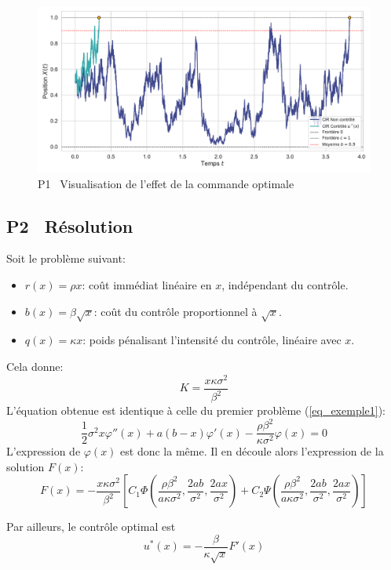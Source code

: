 \begin{figure}[htb]
    \centering
    \includegraphics[width=0.9\linewidth]{img/validation/P1/p1_control_simulation.pdf}
    \caption{P1 \textemdash~Visualisation de l'effet de la commande optimale}
\end{figure}

\subsection{P2 \textemdash~Résolution}\label{p2}
\noindent Soit le problème suivant: 
\begin{itemize}
    \item $r(x) = \rho x$: coût immédiat linéaire en $x$, indépendant du contrôle.
    \item $b(x) = \beta \sqrt{x}$: coût du contrôle proportionnel à $\sqrt{x}$.
    \item $q(x) = \kappa x$: poids pénalisant l'intensité du contrôle, linéaire avec $x$.
\end{itemize}
Cela donne: 
\[
K=\frac{x\kappa \sigma^2}{\beta^2}
\]
L'équation obtenue est identique à celle du premier problème (\ref{eq_exemple1}): 
\[
\frac{1}{2}\sigma^2 x\varphi''(x) + a(b - x)\varphi'(x) - \frac{\rho\beta^2}{\kappa \sigma^2}\varphi(x) = 0
\]
L'expression de $\varphi(x)$ est donc la même. Il en découle alors l'expression de la solution $F(x)$: 
\begin{equation}\label{sol_control_2}
    F(x)=-\frac{x\kappa \sigma^2}{\beta^2}\left[C_1\Phi\left(\frac{\rho\beta^2}{a\kappa \sigma^2},\frac{2ab}{\sigma^2},\frac{2ax}{\sigma^2}\right) + C_2\Psi\left(\frac{\rho\beta^2}{a\kappa \sigma^2},\frac{2ab}{\sigma^2},\frac{2ax}{\sigma^2}\right)\right]
\end{equation}

Par ailleurs, le contrôle optimal est
\begin{equation}\label{optimal_control_2}
    u^*(x)=-\frac{\beta}{\kappa\sqrt{x}}F'(x)
\end{equation}
